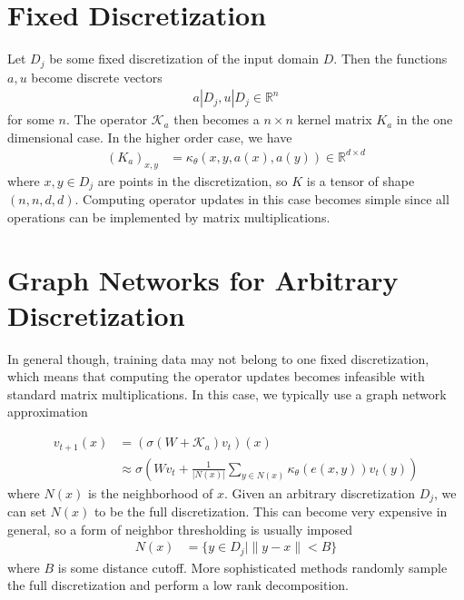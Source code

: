 \documentclass[book.tex]{subfiles}
\begin{document}

\section{Fixed Discretization}
Let $D_j$ be some fixed discretization of the input domain $D$. Then the functions $a, u$ become discrete vectors
\begin{align}
a | D_j, u | D_j \in \mathbb{R}^n
\end{align}
for some $n$. The operator $\mathcal{K}_a$ then becomes a $n \times n$ kernel matrix $K_a$ in the one dimensional case. In the higher order case, we have
\begin{align}
(K_a)_{x, y} &= \kappa_\theta(x, y, a(x), a(y)) \in \mathbb{R}^{d \times d}
\end{align}
where $x, y \in D_j$ are points in the discretization, so $K$ is a tensor of shape $(n, n, d, d)$. Computing operator updates in this case becomes simple since all operations can be implemented by matrix multiplications.

\section{Graph Networks for Arbitrary Discretization}

In general though, training data may not belong to one fixed discretization, which means that computing the operator updates becomes infeasible with standard matrix multiplications. In this case, we typically use a graph network approximation

\begin{align}
v_{t+1}(x) &= (\sigma(W + \mathcal{K}_a)v_t)(x) \\
& \approx \sigma \left (W v_{t} + \frac{1}{|N(x)|} \sum_{y \in N(x)} \kappa_\theta (e(x,y)) v_t(y) \right)
\end{align}
where $N(x)$ is the neighborhood of $x$. Given an arbitrary discretization $D_j$, we can set $N(x)$ to be the full discretization. This can become very expensive in general, so a form of neighbor thresholding is usually imposed
\begin{align}
N(x) &= \{y \in D_j | \|y - x\| < B \}
\end{align}
where $B$ is some distance cutoff. More sophisticated methods randomly sample the full discretization and perform a low rank decomposition. 
\end{document}
